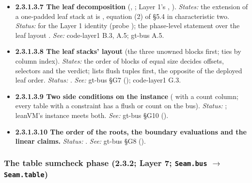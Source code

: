 \begin{itemize}[label={}, leftmargin=1.3em, itemindent=-1.3em, labelwidth=0pt, labelsep=0pt, itemsep=4pt, topsep=3pt]
\begin{itemize}[label={}, leftmargin=1.3em, itemindent=-1.3em, labelwidth=0pt, labelsep=0pt, itemsep=4pt, topsep=3pt]
\item {}\label{obl:node-2.3.1.3.7}\textbf{2.3.1.3.7 The leaf decomposition} (, ; Layer 1's , ). \emph{States:} the extension of a one-padded leaf stack at  is , equation (2) of §5.4 in characteristic two. \emph{Status:}  for the Layer 1 identity (probe ); the phase-level statement over the leaf layout . \emph{See:} code-layer1 B.3, A.5; gt-bus A.5.
\item {}\label{obl:node-2.3.1.3.8}\oblflag\textbf{2.3.1.3.8 The leaf stacks' layout} (the three unowned blocks first; ties by column index). \emph{States:} the order of blocks of equal size decides offsets, selectors and the verdict;  lists flush tuples first, the opposite of the deployed leaf order. \emph{Status:}  . \emph{See:} gt-bus §G7 (); code-layer1 G.3.
\item {}\label{obl:node-2.3.1.3.9}\oblflag\textbf{2.3.1.3.9 Two side conditions on the instance} ( with a count column; every table with a constraint has a flush or count on the bus). \emph{Status:}  ; leanVM's instance meets both. \emph{See:} gt-bus §G10 ().
\item {}\label{obl:node-2.3.1.3.10}\oblflag\textbf{2.3.1.3.10 The order of the roots, the boundary evaluations and the linear claims.} \emph{Status:}  . \emph{See:} gt-bus §G8 ().
\end{itemize}
\end{itemize}

\subsubsection{The table sumcheck phase (2.3.2; Layer 7; \texttt{Seam.bus} \texorpdfstring{$\to$}{to} \texttt{Seam.table})}\label{sec:obl-phase-table}

